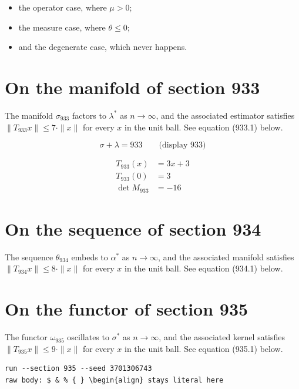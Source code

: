 \documentclass{article}
\begin{document}
\begin{itemize}
  \item the operator case, where $\mu > 0$;
  \item the measure case, where $\theta \leq 0$;
  \item and the degenerate case, which never happens.
\end{itemize}

\section{On the manifold of section 933}
The manifold $\sigma_{933}$ factors to $\lambda^{*}$ as $n \to \infty$,
and the associated estimator satisfies $\|T_{933} x\| \leq 7 \cdot \|x\|$
for every $x$ in the unit ball. See equation (933.1) below.

$$
\sigma + \lambda = 933 \qquad \text{(display 933)}
$$

\begin{align}
T_{933}(x) &= 3 x + 3 \\
T_{933}(0) &= 3 \\
\det M_{933} &= -16
\end{align}

\section{On the sequence of section 934}
The sequence $\theta_{934}$ embeds to $\alpha^{*}$ as $n \to \infty$,
and the associated manifold satisfies $\|T_{934} x\| \leq 8 \cdot \|x\|$
for every $x$ in the unit ball. See equation (934.1) below.

\section{On the functor of section 935}
The functor $\omega_{935}$ oscillates to $\sigma^{*}$ as $n \to \infty$,
and the associated kernel satisfies $\|T_{935} x\| \leq 9 \cdot \|x\|$
for every $x$ in the unit ball. See equation (935.1) below.

\begin{verbatim}
run --section 935 --seed 3701306743
raw body: $ & % { } \begin{align} stays literal here
\end{verbatim}
\end{document}
